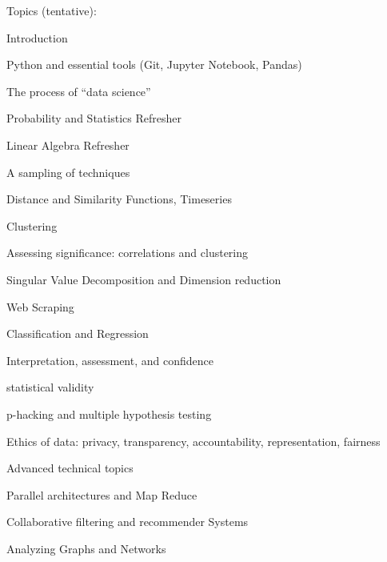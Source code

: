 \documentclass[11pt]{article}
\begin{document}
Topics (tentative):
\begin{compactitem}
\item Introduction
  \begin{compactitem}
\item Python and essential tools (Git, Jupyter Notebook, Pandas)
  \item The process of ``data science''
  \item Probability and Statistics Refresher
  \item Linear Algebra Refresher
  \end{compactitem}
\item A sampling of techniques
  \begin{compactitem}
\item Distance and Similarity Functions, Timeseries
  \item Clustering
  \item Assessing significance: correlations and clustering
  \item Singular Value Decomposition and Dimension reduction
  \item Web Scraping
  \item Classification and Regression
  \end{compactitem}
\item Interpretation, assessment, and confidence
  \begin{compactitem}
  \item statistical validity
  \item p-hacking and multiple hypothesis testing
  \end{compactitem}
\item Ethics of data: privacy, transparency, accountability, representation, fairness

\item Advanced technical topics
  \begin{compactitem}
\item Parallel architectures and Map Reduce

  \item Collaborative filtering and recommender Systems


  \item Analyzing Graphs and Networks
  \end{compactitem}
\end{compactitem}
\end{document}
